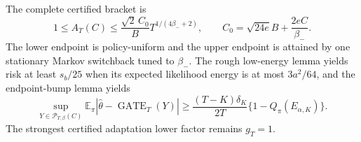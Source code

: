 The complete certified bracket is \[1\le A_T(C)\le\frac{\sqrt2\,C_0}{B}T^{1/(4\beta_-+2)},\qquad C_0=\sqrt{24e}B+\frac{2eC}{\beta_-}.\] The lower endpoint is policy-uniform and the upper endpoint is attained by one stationary Markov switchback tuned to \(\beta_-\). The rough low-energy lemma yields risk at least \(s_b/25\) when its expected likelihood energy is at most \(3a^2/64\), and the endpoint-bump lemma yields \[\sup_{Y\in\mathcal P_{T,\beta}(C)}\mathbb E_\pi|\widehat\theta-\operatorname{GATE}_T(Y)|\ge\frac{(T-K)\delta_K}{2T}\{1-Q_\pi(E_{\alpha,K})\}.\] The strongest certified adaptation lower factor remains \(g_T=1\).